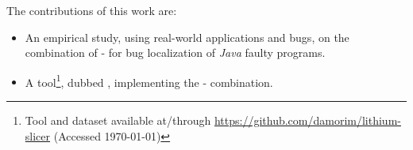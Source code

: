\documentclass{article}
\begin{document}
The contributions of this work are:
\begin{itemize}
 \item[1)]An empirical study, using
real-world applications and bugs, on the combination of \ds{}-\sfl{} for bug localization of \emph{Java} faulty programs.
\item[2)]A
tool\footnote{Tool and dataset available at/through \url{https://github.com/damorim/lithium-slicer} (Accessed \today)}, dubbed \comb{}, implementing the \ds{}-\sfl{} combination. 
\end{itemize}








\end{document}
